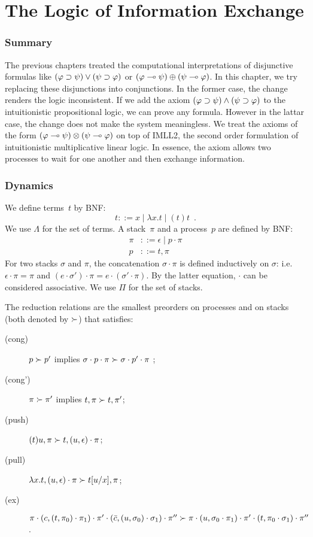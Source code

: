 \chapter{The Logic of Information Exchange}
\label{ch:exchange}

\subsection{Summary}

The previous chapters treated the computational interpretations of
disjunctive formulas like $(\varphi\supset\psi)\lor(\psi\supset\varphi)$ or
$(\varphi\multimap\psi)\oplus(\psi\multimap\varphi)$.  In this chapter, we try
replacing these disjunctions into conjunctions.
In the former case, the change renders the logic inconsistent.
If we add the axiom $(\varphi\supset\psi)\land(\psi\supset\varphi)$ to the
intuitionistic propositional logic,
we can prove any formula.  However in the lattar case, the change does
not make the system meaningless.  We treat
the axioms of the form $(\varphi\multimap\psi)\otimes(\psi\multimap\varphi)$
on top of IMLL2, the second order formulation of intuitionistic
multiplicative linear
logic.  In essence, the axiom allows two processes to wait for one
another and then exchange information.

\subsection{Dynamics}

We define terms~$t$ by BNF:
\[
 t ::= x\mid \lambda x.t\mid (t)t\enspace.
\]
We use $\Lambda$ for the set of terms.
A stack~$\pi$ and a process~$p$
are defined by BNF:
\begin{align*}
 \pi &::= \epsilon\mid p\cdot\pi\\
 p   &::= t,\pi
\end{align*}
For two stacks $\sigma$ and $\pi$, the concatenation $\sigma\cdot\pi$ is
defined
inductively on $\sigma$: i.e. $\epsilon\cdot\pi = \pi$ and $(e
\cdot \sigma') \cdot \pi = e\cdot (\sigma'\cdot \pi)$.  By the latter
equation, $\cdot$ can be considered associative.
We use $\Pi$ for the set of stacks.

The reduction relations are the smallest preorders on processes
 and on stacks (both denoted by $\succ$) that satisfies:
\begin{description}
 \item[(cong)] $p\succ p'$ implies $\sigma \cdot p \cdot \pi\succ
      \sigma\cdot p'\cdot \pi$ \enspace;
 \item[(cong')] $\pi\succ\pi'$ implies $t,\pi\succ t,\pi'$\enspace;
 \item[(push)]
	    $(t)u, \pi   \succ t,(u,\epsilon)\cdot\pi$\enspace;
 \item[(pull)]
	    $\lambda x.t,(u,\epsilon)\cdot\pi
	     \succ
	     t[u/x], \pi$\enspace;
 \item[(ex)]
           $\pi\cdot (c, (t,\pi_0)\cdot \pi_1)\cdot\pi' \cdot (\bar{c},(u,\sigma_0)\cdot \sigma_1) \cdot \pi''\succ
      \pi\cdot (u, \sigma_0\cdot \pi_1)\cdot\pi' \cdot (
      t,\pi_0\cdot \sigma_1) \cdot \pi''
      $
      \enspace.
\end{description}


